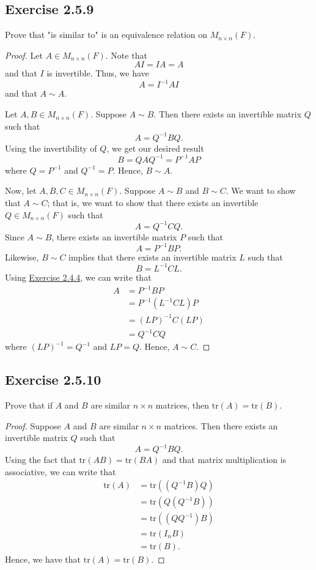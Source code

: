 \subsection*{Exercise 2.5.9} Prove that "is similar to" is an equivalence relation on \( {M}_{n \times n }(F) \).
\begin{proof}
Let \( A \in {M}_{n \times n }(F)  \). Note that
\[  AI = IA = A  \] and that \( I   \) is invertible. Thus, we have
\[  A = I^{-1} A I \]
and that \( A \sim A  \). 

Let \( A, B \in {M}_{n \times n }(F) \). Suppose \( A \sim B  \). Then there exists an invertible matrix \( Q  \) such that 
\[  A = Q^{-1} B Q. \] Using the invertibility of \( Q  \), we get our desired result
\[  B = Q A Q^{-1} = P^{-1} A P  \]
where \( Q = P^{-1} \) and \( Q^{-1} = P  \). Hence, \( B \sim A  \).

Now, let \( A, B , C \in {M}_{n \times n}(F) \). Suppose \( A \sim B  \) and \( B \sim C  \). We want to show that \( A  \sim C  \); that is, we want to show that there exists an invertible \( Q \in {M}_{n \times n}(F)  \) such that
\[ A = Q^{-1} C Q.   \]
Since \( A \sim B  \), there exists an invertible matrix \( P  \) such that
\[ A = P^{-1} B P.   \]
Likewise, \( B \sim C  \) implies that there exists an invertible matrix \( L  \) such that
\[  B = L^{-1} C L. \]
Using {\hyperref[Exercise 2.4.4]{Exercise 2.4.4}}, we can write that
\begin{align*}
    A &= P^{-1} B P  \\
      &= P^{-1} (L^{-1} C L) P \\ 
      &= (LP)^{-1} C (LP) \\
      &= Q^{-1} C Q
\end{align*}
where \( (LP)^{-1} = Q^{-1} \) and \( LP = Q  \). Hence, \( A \sim C  \).
\end{proof}

\subsection*{Exercise 2.5.10}\label{Exercise 2.5.10} Prove that if \( A  \) and \( B  \) are similar \( n \times n  \) matrices, then \( \text{tr}(A) = \text{tr}(B) \).
\begin{proof}
    Suppose \( A  \) and \( B  \) are similar \( n \times n \) matrices. Then there exists an invertible matrix \( Q  \) such that
    \[  A = Q^{-1} B Q. \]
    Using the fact that \( \text{tr}(AB) = \text{tr}(BA) \) and that matrix multiplication is associative, we can write that
    \begin{align*}
        \text{tr}(A) &= \text{tr}((Q^{-1}B) Q) \\
                     &= \text{tr}(Q (Q^{-1}B)) \\
                     &= \text{tr}((Q Q^{-1})B) \\ 
                     &= \text{tr}({I}_{n}B ) \\
                     &=  \text{tr}(B). 
    \end{align*}
    Hence, we have that \( \text{tr}(A ) = \text{tr}(B) \).
\end{proof}

